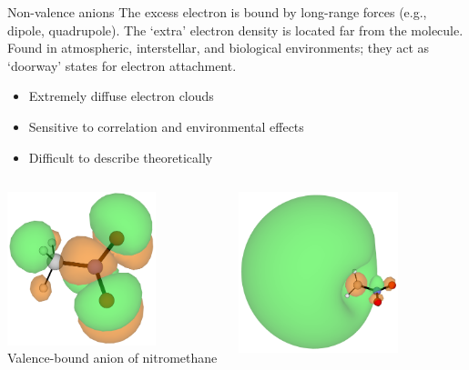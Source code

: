 \documentclass[9pt,t,xcolor=table]{beamer}
\begin{document}
\begin{frame}{\huge Non-valence anions}\large
    \vspace{5pt}
	The excess electron is bound by long-range forces (e.g., dipole, quadrupole). The `extra' electron density is located far from the molecule.\\
	Found in atmospheric, interstellar, and biological environments; they act as `doorway' states for electron attachment. 
    \begin{itemize} 

            \item Extremely diffuse electron clouds
            \item Sensitive to correlation and environmental effects
            \item Difficult to describe theoretically
    \end{itemize}
    \vspace{5pt}
	\begin{columns}
		\begin{column}{0.27\textwidth}
			\centering
			\includegraphics[width=0.7\textwidth]{Figs/MeNO2_VBS.png}\\
			\vspace{3pt}
			\small Valence-bound anion of nitromethane
		\end{column}
		\begin{column}{0.3\textwidth}
			\centering
			\includegraphics[width=0.7\textwidth]{Figs/MeNO2_DBS.png}\\

\end{column}
\end{columns}
\end{frame}
\end{document}
